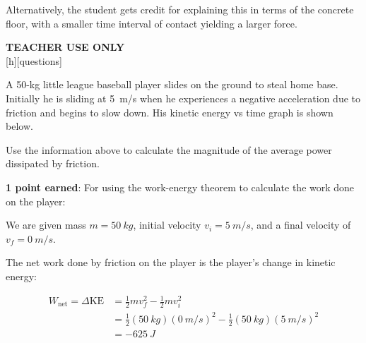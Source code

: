 \documentclass[answers]{exam}
\newif\ifversionKlevel
\begin{document}
\begin{questions}
\begin{solution}
 Alternatively, the student gets credit for explaining this in terms of the concrete floor, with a smaller time interval of contact yielding a larger force.
\end{solution}

\vspace*{\fill}

\ifprintanswers
\else
\begin{mdframed}[backgroundcolor=black!10]
    \centering
    \textbf{\small TEACHER USE ONLY}\\[1em]
    [h][questions]
\end{mdframed}
\fi

\ifversionKlevel
\clearpage

\question[2]
A 50-kg little league baseball player slides on the ground to steal home base. Initially he is sliding at \SI{5}{m/s} when he experiences a negative acceleration due to friction and begins to slow down. His kinetic energy vs time graph is shown below.

\begin{center}
\end{center}

Use the information above to calculate the magnitude of the average power dissipated by friction.

\begin{solutionorbox}[12cm]

\textbf{\color{red} 1 point earned}: For using the work-energy theorem to calculate the work done on the player: \medskip

We are given mass $m = \SI{50}{kg}$, initial velocity $v_i = \SI{5}{m/s}$, and a final velocity of $v_f = \SI{0}{m/s}$. 

The net work done by friction on the player is the player's change in kinetic energy:

\begin{align*}
    W_\mathrm{net} = \Delta \mathrm{KE} &= \frac{1}{2}m v_f^2 - \frac{1}{2}m v_i^2 \\[1ex]
    &= \frac{1}{2}(\SI{50}{kg}) \left(\SI{0}{m/s}\right)^2 - \frac{1}{2}(\SI{50}{kg}) \left(\SI{5}{m/s}\right)^2 \\[1ex]
    &= \SI{-625}{J}
\end{align*}


\end{solutionorbox}
\end{questions}
\end{document}
